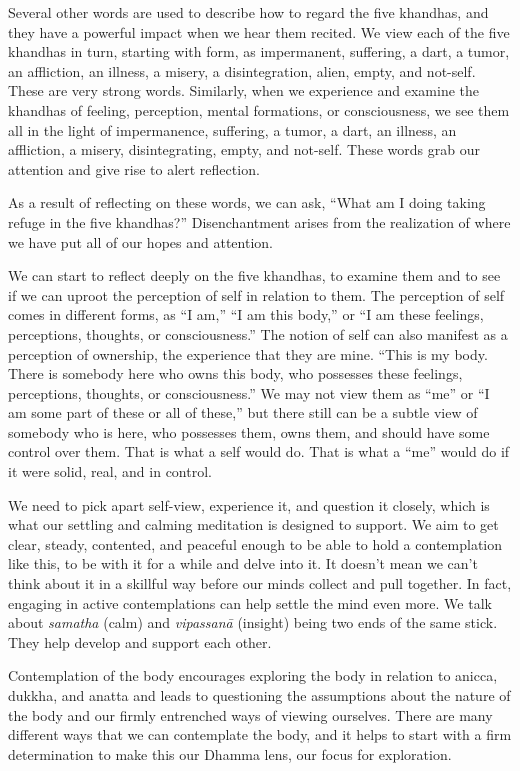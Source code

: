Several other words are used to describe how to regard the five khandhas, and they have a powerful impact when we hear them recited. We view each of the five khandhas in turn, starting with form, as impermanent, suffering, a dart, a tumor, an affliction, an illness, a misery, a disintegration, alien, empty, and not-self. These are very strong words. Similarly, when we experience and examine the khandhas of feeling, perception, mental formations, or consciousness, we see them all in the light of impermanence, suffering, a tumor, a dart, an illness, an affliction, a misery, disintegrating, empty, and not-self. These words grab our attention and give rise to alert reflection.

As a result of reflecting on these words, we can ask, ``What am I doing taking refuge in the five khandhas?'' Disenchantment arises from the realization of where we have put all of our hopes and attention.

We can start to reflect deeply on the five khandhas, to examine them and to see if we can uproot the perception of self in relation to them. The perception of self comes in different forms, as ``I am,'' ``I am this body,'' or ``I am these feelings, perceptions, thoughts, or consciousness.'' The notion of self can also manifest as a perception of ownership, the experience that they are mine. ``This is my body. There is somebody here who owns this body, who possesses these feelings, perceptions, thoughts, or consciousness.'' We may not view them as ``me'' or ``I am some part of these or all of these,'' but there still can be a subtle view of somebody who is here, who possesses them, owns them, and should have some control over them. That is what a self would do. That is what a ``me'' would do if it were solid, real, and in control.

We need to pick apart self-view, experience it, and question it closely, which is what our settling and calming meditation is designed to support. We aim to get clear, steady, contented, and peaceful enough to be able to hold a contemplation like this, to be with it for a while and delve into it. It doesn't mean we can't think about it in a skillful way before our minds collect and pull together. In fact, engaging in active contemplations can help settle the mind even more. We talk about \emph{samatha} (calm) and \emph{vipassanā} (insight) being two ends of the same stick. They help develop and support each other.

Contemplation of the body encourages exploring the body in relation to anicca, dukkha, and anatta and leads to questioning the assumptions about the nature of the body and our firmly entrenched ways of viewing ourselves. There are many different ways that we can contemplate the body, and it helps to start with a firm determination to make this our Dhamma lens, our focus for exploration.

